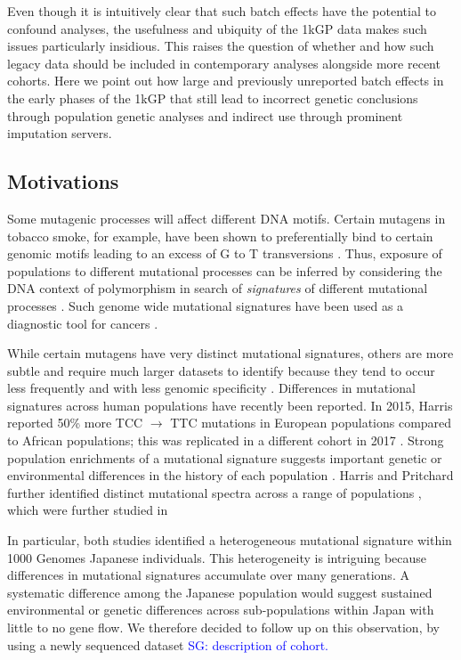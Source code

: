 \documentclass[9pt,lineno]{elife}
\newcommand{\sgcomment}[1]{\textcolor{blue}{SG: #1}}
\begin{document}
Even though it is intuitively clear that such batch effects have the potential to confound analyses, the usefulness and ubiquity of the 1kGP data makes such issues particularly insidious.   This raises the question of whether and how such legacy data should be included in contemporary analyses alongside more recent cohorts. 
Here we point out how large and previously unreported batch effects in the early phases of the 1kGP that still lead to incorrect genetic conclusions through population genetic analyses and indirect use through prominent imputation servers.  

\subsection{Motivations}

Some mutagenic processes will affect different DNA motifs. 
Certain mutagens in tobacco smoke, for example, have been shown to preferentially bind to certain genomic motifs leading to an excess of G to T transversions \citep{Pfeifer2002,Pleasance2010}. 
Thus, exposure of populations to different mutational processes can be inferred by considering the DNA context of polymorphism in search of \textit{signatures} of different mutational processes \citep{Alexandrov2013,Shiraishi2015a}. 
Such genome wide mutational signatures have been used as a diagnostic tool for cancers \citep{Alexandrov2013,Shiraishi2015a}.

While certain mutagens have very distinct mutational signatures, others are more subtle and require much larger datasets to identify because they tend to occur less frequently and with less genomic specificity \citep{Pleasance2010}.
Differences in mutational signatures across human populations have recently been reported.
In 2015, Harris reported 50\% more TCC ${\rightarrow}$ TTC mutations in European populations compared to African populations; this was replicated in a different cohort in 2017 \citep{Harris2015a, Harris2017a, Mathieson2017a}. 
Strong population enrichments of a mutational signature suggests important genetic or environmental differences in the history of each population \citep{Harris2015a, Harris2017a}. 
Harris and Pritchard further identified distinct mutational spectra across a range of populations \citep{Harris2017a}, which were further studied in \citep{Aikens2018}
 
 In particular, both studies  identified a heterogeneous mutational signature within 1000 Genomes Japanese individuals.
This heterogeneity is intriguing because differences in mutational signatures accumulate over many generations.
A systematic difference among the Japanese population would suggest sustained environmental or genetic differences across sub-populations within Japan with little to no gene flow.
We therefore decided to follow up on this observation, by using a newly sequenced dataset \sgcomment{description of cohort.}
\end{document}
